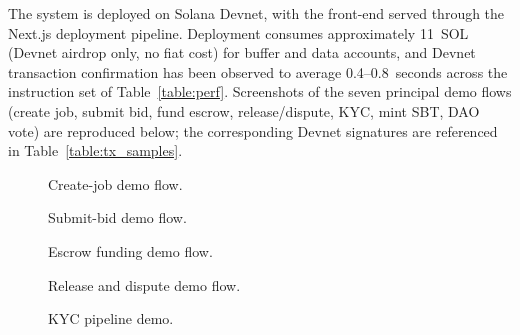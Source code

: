 The system is deployed on Solana Devnet, with the front-end served through the Next.js deployment pipeline. Deployment consumes approximately 11~SOL (Devnet airdrop only, no fiat cost) for buffer and data accounts, and Devnet transaction confirmation has been observed to average 0.4--0.8~seconds across the instruction set of Table~\ref{table:perf}. Screenshots of the seven principal demo flows (create job, submit bid, fund escrow, release/dispute, KYC, mint SBT, DAO vote) are reproduced below; the corresponding Devnet signatures are referenced in Table~\ref{table:tx_samples}.

\begin{figure}[H]
    \centering
    \caption{Create-job demo flow.}
    \label{fig:demo_create_job}
\end{figure}

\begin{figure}[H]
    \centering
    \caption{Submit-bid demo flow.}
    \label{fig:demo_submit_bid}
\end{figure}

\begin{figure}[H]
    \centering
    \caption{Escrow funding demo flow.}
    \label{fig:demo_fund_escrow}
\end{figure}

\begin{figure}[H]
    \centering
    \caption{Release and dispute demo flow.}
    \label{fig:demo_release_dispute}
\end{figure}

\begin{figure}[H]
    \centering
    \caption{KYC pipeline demo.}
    \label{fig:demo_kyc}
\end{figure}

